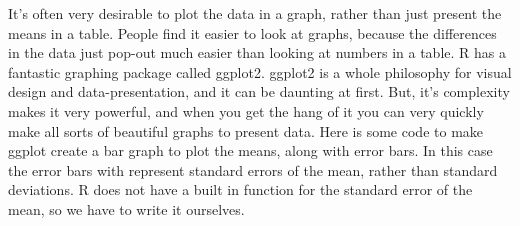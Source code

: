 It's often very desirable to plot the data in a graph, rather than just
present the means in a table. People find it easier to look at graphs,
because the differences in the data just pop-out much easier than
looking at numbers in a table. R has a fantastic graphing package called
ggplot2. ggplot2 is a whole philosophy for visual design and
data-presentation, and it can be daunting at first. But, it's complexity
makes it very powerful, and when you get the hang of it you can very
quickly make all sorts of beautiful graphs to present data. Here is some
code to make ggplot create a bar graph to plot the means, along with
error bars. In this case the error bars with represent standard errors
of the mean, rather than standard deviations. R does not have a built in
function for the standard error of the mean, so we have to write it
ourselves.

\begin{Shaded}
\begin{Highlighting}[]

\StringTok{ }\NormalTok{(} \StringTok{ } \StringTok{ }

\NormalTok{(}
\StringTok{  }\NormalTok{(}\NormalTok{,}\NormalTok{)+}
\StringTok{  }\NormalTok{)+}
\StringTok{  }\NormalTok{(}\NormalTok{)+}
\StringTok{  }\NormalTok{(}\NormalTok{)+}
\StringTok{  }\NormalTok{(}\NormalTok{)}
\end{Highlighting}
\end{Shaded}


